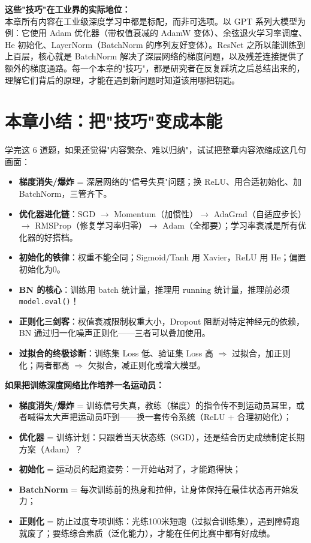 \documentclass[a4paper,11pt]{ctexart}
\begin{document}
\begin{appbox}[现实应用场景]
    \textbf{这些"技巧"在工业界的实际地位：}\\
    本章所有内容在工业级深度学习中都是标配，而非可选项。以 GPT 系列大模型为例：它使用 Adam 优化器（带权值衰减的 AdamW 变体）、余弦退火学习率调度、He 初始化、LayerNorm（BatchNorm 的序列友好变体）。ResNet 之所以能训练到上百层，核心就是 BatchNorm 解决了深层网络的梯度问题，以及残差连接提供了额外的梯度通路。每一个本章的"技巧"，都是研究者在反复踩坑之后总结出来的，理解它们背后的原理，才能在遇到新问题时知道该用哪把钥匙。
\end{appbox}

\section{本章小结：把"技巧"变成本能}

学完这 6 道题，如果还觉得"内容繁杂、难以归纳"，试试把整章内容浓缩成这几句画面：

\begin{itemize}
    \item \textbf{梯度消失/爆炸} = 深层网络的"信号失真"问题；换 ReLU、用合适初始化、加 BatchNorm，三管齐下。
    \item \textbf{优化器进化链}：SGD $\to$ Momentum（加惯性）$\to$ AdaGrad（自适应步长）$\to$ RMSProp（修复学习率归零）$\to$ Adam（全都要）；学习率衰减是所有优化器的好搭档。
    \item \textbf{初始化的铁律}：权重不能全同；Sigmoid/Tanh 用 Xavier，ReLU 用 He；偏置初始化为0。
    \item \textbf{BN 的核心}：训练用 batch 统计量，推理用 running 统计量，推理前必须 \texttt{model.eval()}！
    \item \textbf{正则化三剑客}：权值衰减限制权重大小，Dropout 阻断对特定神经元的依赖，BN 通过归一化噪声正则化——三者可以叠加使用。
    \item \textbf{过拟合的终极诊断}：训练集 Loss 低、验证集 Loss 高 $\Rightarrow$ 过拟合，加正则化；两者都高 $\Rightarrow$ 欠拟合，减正则化或增大模型。
\end{itemize}

\begin{metaphorbox}[给零基础读者的一句总比喻]
    \textbf{如果把训练深度网络比作培养一名运动员：}
    \begin{itemize}
        \item \textbf{梯度消失/爆炸} = 训练信号失真，教练（梯度）的指令传不到运动员耳里，或者喊得太大声把运动员吓到——换一套传令系统（ReLU + 合理初始化）；
        \item \textbf{优化器} = 训练计划：只跟着当天状态练（SGD），还是结合历史成绩制定长期方案（Adam）？
        \item \textbf{初始化} = 运动员的起跑姿势：一开始站对了，才能跑得快；
        \item \textbf{BatchNorm} = 每次训练前的热身和拉伸，让身体保持在最佳状态再开始发力；
        \item \textbf{正则化} = 防止过度专项训练：光练100米短跑（过拟合训练集），遇到障碍跑就废了；要练综合素质（泛化能力），才能在任何比赛中都有好成绩。
    \end{itemize}
\end{metaphorbox}
\end{document}
